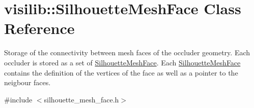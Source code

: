 \hypertarget{classvisilib_1_1_silhouette_mesh_face}{}\section{visilib\+::Silhouette\+Mesh\+Face Class Reference}
\label{classvisilib_1_1_silhouette_mesh_face}


Storage of the connectivity between mesh faces of the occluder geometry. Each occluder is stored as a set of \mbox{\hyperlink{classvisilib_1_1_silhouette_mesh_face}{Silhouette\+Mesh\+Face}}. Each \mbox{\hyperlink{classvisilib_1_1_silhouette_mesh_face}{Silhouette\+Mesh\+Face}} contains the definition of the vertices of the face as well as a pointer to the neigbour faces. 




{\ttfamily \#include $<$silhouette\+\_\+mesh\+\_\+face.\+h$>$}

